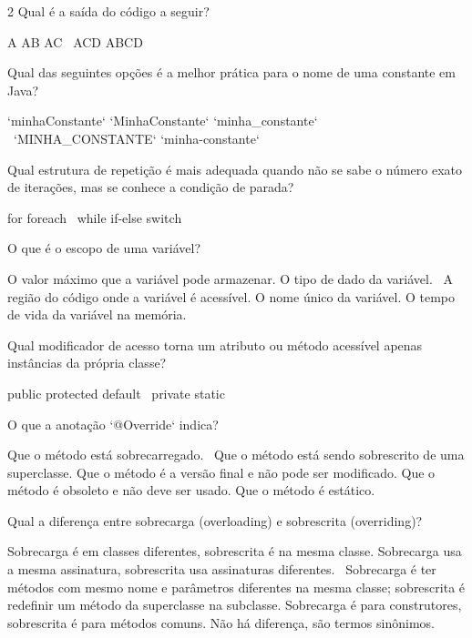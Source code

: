 \documentclass{exam}
\newcounter{solcount}
\newcommand\CC{\
    \CorrectChoice\label{sol:\arabic{solcount}}}
\begin{document}
\begin{questions}
\begin{multicols}{2}
\question[1] Qual é a saída do código a seguir?

\begin{choices}
 \choice A
 \choice AB
 \choice AC
 \CC ACD
 \choice ABCD
\end{choices}

\question[1] Qual das seguintes opções é a melhor prática para o nome de uma constante em Java?
\begin{choices}
 \choice `minhaConstante`
 \choice `MinhaConstante`
 \choice `minha_constante`
 \CC `MINHA_CONSTANTE`
 \choice `minha-constante`
\end{choices}

\question[1] Qual estrutura de repetição é mais adequada quando não se sabe o número exato de iterações, mas se conhece a condição de parada?
\begin{choices}
 \choice for
 \choice foreach
 \CC while
 \choice if-else
 \choice switch
\end{choices}

\question[1] O que é o escopo de uma variável?
\begin{choices}
 \choice O valor máximo que a variável pode armazenar.
 \choice O tipo de dado da variável.
 \CC A região do código onde a variável é acessível.
 \choice O nome único da variável.
 \choice O tempo de vida da variável na memória.
\end{choices}


\question[1] Qual modificador de acesso torna um atributo ou método acessível apenas instâncias da própria classe?
\begin{choices}
 \choice public
 \choice protected
 \choice default
 \CC private
 \choice static
\end{choices}

\question[1] O que a anotação `@Override` indica?
\begin{choices}
 \choice Que o método está sobrecarregado.
 \CC Que o método está sendo sobrescrito de uma superclasse.
 \choice Que o método é a versão final e não pode ser modificado.
 \choice Que o método é obsoleto e não deve ser usado.
 \choice Que o método é estático.
\end{choices}

\question[1] Qual a diferença entre sobrecarga (overloading) e sobrescrita (overriding)?
\begin{choices}
 \choice Sobrecarga é em classes diferentes, sobrescrita é na mesma classe.
 \choice Sobrecarga usa a mesma assinatura, sobrescrita usa assinaturas diferentes.
 \CC Sobrecarga é ter métodos com mesmo nome e parâmetros diferentes na mesma classe; sobrescrita é redefinir um método da superclasse na subclasse.
 \choice Sobrecarga é para construtores, sobrescrita é para métodos comuns.
 \choice Não há diferença, são termos sinônimos.
\end{choices}


\end{multicols}
\end{questions}
\end{document}
